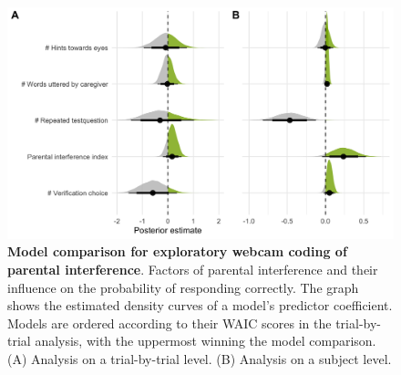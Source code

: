 \documentclass[
  man,floatsintext]{apa6}
\begin{document}
\begin{figure}

{\centering \includegraphics[width=1\linewidth]{../figures/supplements_webcamcoding_draws} 

}

\caption{\textbf{Model comparison for exploratory webcam coding of parental interference}.
Factors of parental interference and their influence on the probability of responding correctly. The graph shows the estimated density curves of a model's predictor coefficient. Models are ordered according to their WAIC scores in the trial-by-trial analysis, with the uppermost winning the model comparison. (A) Analysis on a trial-by-trial level. (B) Analysis on a subject level.}\label{fig:fig5}
\end{figure}
\end{document}
